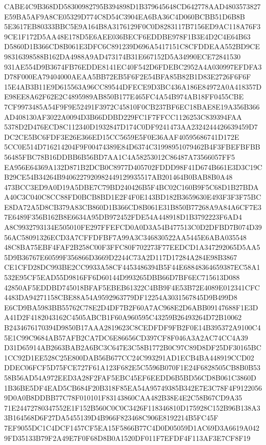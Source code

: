\documentclass[UTF8,fontset=fandol,zihao=-4,a4paper]{ctexart}
\begin{document}
{{CABE4C9B368DD58300982795B394898D1B379645648CD642778AAD4803573827E59BA5AF9A8CE05329D774C8D54C3904EA6BA36C4D060BCBB51D6B8B
5E3617EB80333BBC5E9A164B8A3176129F0C0D8283117B7156ED9AC118A76F39CE1F172D5AA48E178D5E6AEE036BECF6EDDBE978F1B3E4D2C4E64B63
D5860D1B366CD8B061E3DFC6C891239D696A5417151C8CFDDEAA552BD9CE98316398588B162DA4988A9AD473174B31E667152D5A34990ECE72841530
931AE554D9B3674FB76EDDE8141EC40F542D6FDEBC2952A4A030997EFDFA3D78F000EA79404000AEAA5BB72EB5F6F2E54BFA85B82B1D83E2726F6F6F
15E4AB3B11E9D615563A96CC89544DFECE9D3BC436A186E84972A0A418357DE98EE8A62F62E2C4895989AB850B177E465FC4A54B974AB18FF0455CBE
7CF9973485A54F9F9E52491F3972C45810F0CB237BF6EC18BAE8E19A356B366AD408130AF3022A0094D3B66DDBD229FC1F7FFCC1126253C839394FAA
5378D2D476ECD8C112340D1932847D174C0DF9241473AA2324244426639459D7DC2CE5BC6FDF3E26E366ED15CC5659E5F0E36AAF40595686741D172E
5CC0E514D716214204F9F00474389E84D6374C31998951079462B4F3FBEFBFBB56485FBC78B16DDBB6B56BD7AA1C4A58253012C86487A73566057FF5
EA956E64369A132D871B2DCB0C8977D405702FDDD98F41D674B661E3D3C19CB29CE54B34264B9406227920982449129935517AB201464B0BAB8B0A48
473BCC3ED9A0D19A5DBE7C79BD240426B5F4BC02C160B9F5C68D1B27BDAA40C3C040C8CC88FD0BCB8BD1E2F4F0E143BD182B3659630E493F3F3F75BC
E8DA72A5D8CB379A83CB860D1B366CD8B061E31B850B77268A9A84A6CF7E37E6489F356B162B8E6634A95DB972452FDE54A448918D1B3792223F6AD4
A8C9932793134E505010FE297FFEFCD0A0D3A54B477513C0D2DFBD7B074D3956AC58091326ECD3A7CFFDFBF7A99A3C346830522AA5445E6ABA035548
48C8BA75EBF4FAF2B258C00F3FFC80F702273F77EEDCD1A347292065D5AA55D9B36767E60599F356866D3669D2244C73A2D117D17284A284E98B3867
CE1CFD28DC993BE2CC9933A58CF4453486394B5F44E68848364659387EC58A1532E95CF5EAD55D9816FF6D60144D993265DBB66D7BF6EC715613D088
42850AF5EDDBD745018BFAF5EBEB61322C4BB9F4E53B72E4089E012341CFC4483DA94271158CBE88A54A9592963779DF12254A3031567845D9B499D8
E6CD9BA5983BB55762C78E2D4DF7B2F60A7AC968E2D6ABB09147688F1E3DA41D2F4182043162C4505ABCB1F60A960595C43259B26493264D72B10062
B2434676170394D9850B17AAA2819623C8CEDFDF9FB2F0E14B395372A9100C45E1C99C9684AB57AFB2CA7DC6E86656CD397CF8F046A3A2AC74CC4A39
D31D65914AB2663BAB2A6BC3C647E3C58B1772B0C97C89D8DF25DF30165BC1CC92D1EE528C25E800DAB56B677CC24C993291AD1ECB4BA448919CCD02
DDEC06FCF5D75FCE727F61A123F682E5C5596B070F1E24F6828505CB8B0B5358B56AD54A972EED3A28F2FAF5EBC45EF6EEDD6B5BD56CD8B061C3860D
1B36BE5DF4EAD5CB684F20B318F85EA54A95749385B342E7E3C78F4F91220569D0A0B8DDBB77C78F010101F83143860CAA482B38E4E2C58B67CD9A35
71E24472780347552E1F152B560C0C0C3426F118346810D175928C152B96B138A33B164568D6F27DA5455139D4B966F823468C906E8192214B5FC45F
7EF9055DC1C4DCF1457CF5EA15F5866B77C4D0D05059D1AC69D3A6619A0429FD35133B79F2A49E7F0F68D8B0A1520DF011F7EFDF4F113AF3E7CF8F19
}}
\end{document}
